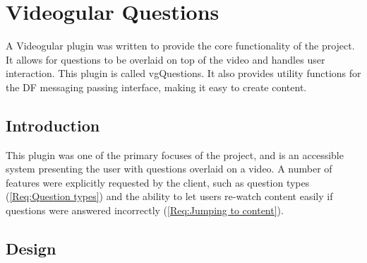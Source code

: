
\chapter{Videogular Questions} \label{Chapter:VideogularQuestions}

\begin{preamble}
	A \gls{Videogular} plugin was written to provide the core functionality of the project. It allows for questions to be overlaid on top of the video and handles user interaction. This plugin is called \gls{vgQuestions}. It also provides utility functions for the \gls{DF} messaging passing interface, making it easy to create content.
\end{preamble}

\section{Introduction}

This plugin was one of the primary focuses of the project, and is an accessible system presenting the user with questions overlaid on a video. A number of features were explicitly requested by the client, such as question types (\cref{Req:Question types}) and the ability to let users re-watch content easily if questions were answered incorrectly (\cref{Req:Jumping to content}).

\section{Design}


